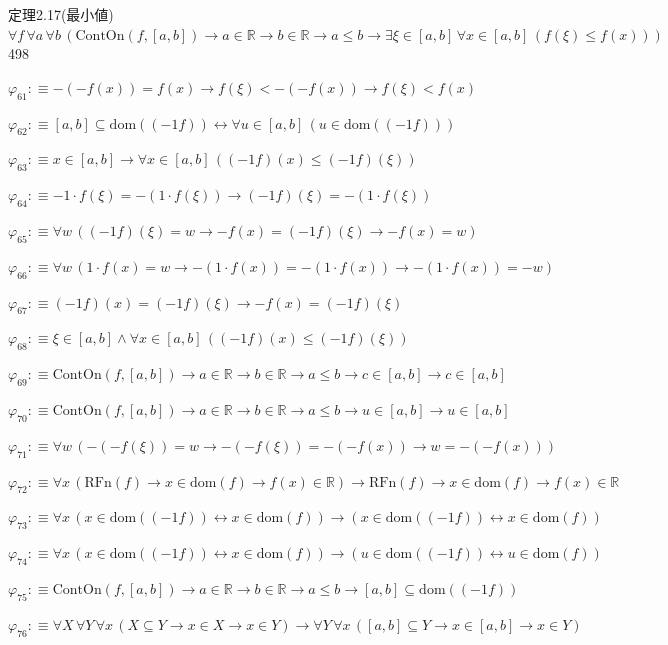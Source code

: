 \begin{fullproof}{定理2.17(最小値)}{$\forall f\,\forall a\,\forall b\,(\mathrm{ContOn}(f,[a,b]) \to a \in \mathbb{R} \to b \in \mathbb{R} \to a \leq b \to \exists \xi \in [a,b]\,\forall x \in [a,b]\,(f(\xi) \leq f(x)))$}{498}
\begin{abbrevlist}
\item $\varphi_{61} :\equiv -(-f(x)) = f(x) \to f(\xi) < -(-f(x)) \to f(\xi) < f(x)$
\item $\varphi_{62} :\equiv [a,b] \subseteq \mathrm{dom}((-1 f)) \leftrightarrow \forall u \in [a,b]\,(u \in \mathrm{dom}((-1 f)))$
\item $\varphi_{63} :\equiv x \in [a,b] \to \forall x \in [a,b]\,((-1 f)(x) \leq (-1 f)(\xi))$
\item $\varphi_{64} :\equiv -1 \cdot f(\xi) = -(1 \cdot f(\xi)) \to (-1 f)(\xi) = -(1 \cdot f(\xi))$
\item $\varphi_{65} :\equiv \forall w\,((-1 f)(\xi) = w \to -f(x) = (-1 f)(\xi) \to -f(x) = w)$
\item $\varphi_{66} :\equiv \forall w\,(1 \cdot f(x) = w \to -(1 \cdot f(x)) = -(1 \cdot f(x)) \to -(1 \cdot f(x)) = -w)$
\item $\varphi_{67} :\equiv (-1 f)(x) = (-1 f)(\xi) \to -f(x) = (-1 f)(\xi)$
\item $\varphi_{68} :\equiv \xi \in [a,b] \land \forall x \in [a,b]\,((-1 f)(x) \leq (-1 f)(\xi))$
\item $\varphi_{69} :\equiv \mathrm{ContOn}(f,[a,b]) \to a \in \mathbb{R} \to b \in \mathbb{R} \to a \leq b \to c \in [a,b] \to c \in [a,b]$
\item $\varphi_{70} :\equiv \mathrm{ContOn}(f,[a,b]) \to a \in \mathbb{R} \to b \in \mathbb{R} \to a \leq b \to u \in [a,b] \to u \in [a,b]$
\item $\varphi_{71} :\equiv \forall w\,(-(-f(\xi)) = w \to -(-f(\xi)) = -(-f(x)) \to w = -(-f(x)))$
\item $\varphi_{72} :\equiv \forall x\,(\mathrm{RFn}(f) \to x \in \mathrm{dom}(f) \to f(x) \in \mathbb{R}) \to \mathrm{RFn}(f) \to x \in \mathrm{dom}(f) \to f(x) \in \mathbb{R}$
\item $\varphi_{73} :\equiv \forall x\,(x \in \mathrm{dom}((-1 f)) \leftrightarrow x \in \mathrm{dom}(f)) \to (x \in \mathrm{dom}((-1 f)) \leftrightarrow x \in \mathrm{dom}(f))$
\item $\varphi_{74} :\equiv \forall x\,(x \in \mathrm{dom}((-1 f)) \leftrightarrow x \in \mathrm{dom}(f)) \to (u \in \mathrm{dom}((-1 f)) \leftrightarrow u \in \mathrm{dom}(f))$
\item $\varphi_{75} :\equiv \mathrm{ContOn}(f,[a,b]) \to a \in \mathbb{R} \to b \in \mathbb{R} \to a \leq b \to [a,b] \subseteq \mathrm{dom}((-1 f))$
\item $\varphi_{76} :\equiv \forall X\,\forall Y\,\forall x\,(X \subseteq Y \to x \in X \to x \in Y) \to \forall Y\,\forall x\,([a,b] \subseteq Y \to x \in [a,b] \to x \in Y)$

\end{abbrevlist}
\end{fullproof}
